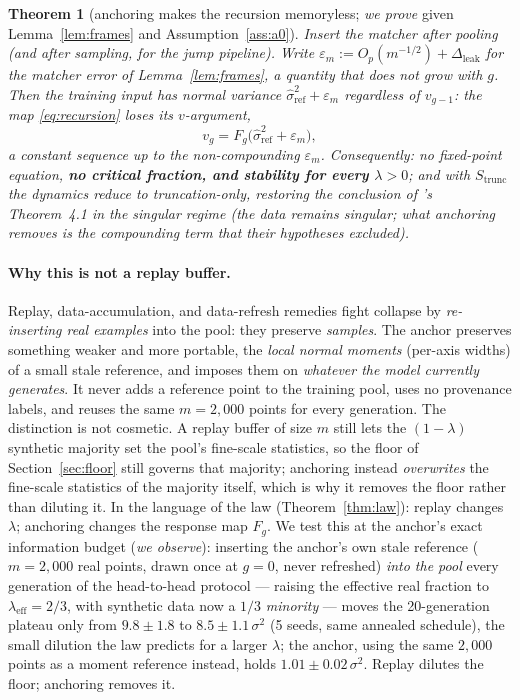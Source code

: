 \documentclass[11pt]{article}
\newtheorem{theorem}{Theorem}
\theoremstyle{remark}
\newcommand{\eps}{\varepsilon}
\newcommand{\sigsq}{\sigma^2}
\begin{document}
\begin{theorem}[anchoring makes the recursion memoryless; \emph{we prove} given
Lemma~\ref{lem:frames} and Assumption~\ref{ass:a0}]\label{thm:fix}
Insert the matcher after pooling (and after sampling, for the jump pipeline). Write
$\eps_m:=O_p(m^{-1/2})+\Delta_{\mathrm{leak}}$ for the matcher error of
Lemma~\ref{lem:frames}, a quantity that does not grow with $g$. Then the
training input has normal variance $\hat\sigma^2_{\mathrm{ref}}+\eps_m$
\emph{regardless of $v_{g-1}$}: the map \eqref{eq:recursion} loses its $v$-argument,
\[
v_g=F_g\big(\hat\sigma^2_{\mathrm{ref}}+\eps_m\big),
\]
a constant sequence up to the non-compounding $\eps_m$. Consequently: no fixed-point
equation, \textbf{no critical fraction, and stability for every $\lambda>0$}; and with
$S_{\mathrm{trunc}}$ the dynamics reduce to truncation-only, restoring the
\emph{conclusion} of \citet{khelifa2026recursive}'s Theorem~4.1 in the singular regime
(the data remains singular; what anchoring removes is the compounding term that their
hypotheses excluded).
\end{theorem}

\paragraph{Why this is not a replay buffer.} Replay, data-accumulation, and data-refresh
remedies \citep{gerstgrasser2024collapse,bertrand2024stability} fight collapse by
\emph{re-inserting real examples} into the pool: they preserve \emph{samples}. The anchor
preserves something weaker and more portable, the \emph{local normal moments} (per-axis
widths) of a small stale reference, and imposes them on \emph{whatever the model currently
generates}. It never adds a reference point to the training pool, uses no provenance labels,
and reuses the same $m{=}2{,}000$ points for every generation. The distinction is not
cosmetic. A replay buffer of size $m$ still lets the $(1-\lambda)$ synthetic majority set the
pool's fine-scale statistics, so the floor of Section~\ref{sec:floor} still governs that
majority; anchoring instead \emph{overwrites} the fine-scale statistics of the majority
itself, which is why it removes the floor rather than diluting it. In the language of the law
(Theorem~\ref{thm:law}): replay changes $\lambda$; anchoring changes the response map $F_g$.
We test this at the anchor's exact information budget (\emph{we observe}): inserting the
anchor's own stale reference ($m=2{,}000$ real points, drawn once at $g=0$, never
refreshed) \emph{into the pool} every generation of the head-to-head protocol ---
raising the effective real fraction to $\lambda_{\mathrm{eff}}=2/3$, with synthetic data
now a $1/3$ \emph{minority} --- moves the 20-generation plateau only from $9.8\pm1.8$ to
$8.5\pm1.1\,\sigsq$ (5 seeds, same annealed schedule), the small dilution the law
predicts for a larger $\lambda$; the anchor, using the same $2{,}000$ points as a moment
reference instead, holds $1.01\pm0.02\,\sigsq$. Replay dilutes the floor; anchoring
removes it.
\end{document}
